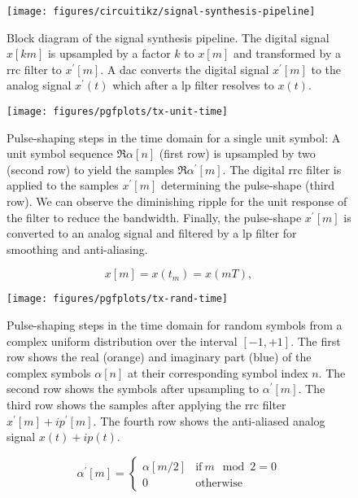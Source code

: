 

\begin{figure}[htb]
	\centering
	\texttt{[image: figures/circuitikz/signal-synthesis-pipeline]}
	\caption{Block diagram of the signal synthesis pipeline. The digital signal $x[km]$ is upsampled by a factor $k$ to $x[m]$ and transformed by a \gls{rrc} filter to $x^\prime[m]$. A \gls{dac} converts the digital signal $x^\prime[m]$ to the analog signal $x^\prime(t)$ which after a \gls{lp} filter resolves to $x(t)$.}
\end{figure}


\begin{figure}[htb]
	\centering
	\texttt{[image: figures/pgfplots/tx-unit-time]}
	\caption{Pulse-shaping steps in the time domain for a single unit symbol: A unit symbol sequence $\Re\alpha[n]$ (first row) is upsampled by two (second row) to yield the samples $\Re\alpha^\prime[m]$. The digital \gls{rrc} filter is applied to the samples $x^\prime[m]$ determining the pulse-shape (third row). We can observe the diminishing ripple for the unit response of the filter to reduce the bandwidth. Finally, the pulse-shape $x^\prime[m]$ is converted to an analog signal and filtered by a \gls{lp} filter for smoothing and anti-aliasing.}\label{fig:pulse_shaping_unit_time}
\end{figure}

\begin{equation}
	x[m]
	=
	x(t_m)
	=
	x(mT)
	,
\end{equation}

\begin{figure}[htb]
	\centering
	\texttt{[image: figures/pgfplots/tx-rand-time]}
	\caption{Pulse-shaping steps in the time domain for random symbols from a complex uniform distribution over the interval $[-1,+1]$. The first row shows the real (orange) and imaginary part (blue) of the complex symbols $\alpha[n]$ at their corresponding symbol index $n$. The second row shows the symbols after upsampling to $\alpha^\prime[m]$. The third row shows the samples after applying the \gls{rrc} filter $x^\prime[m]+ip^\prime[m]$. The fourth row shows the anti-aliased analog signal $x(t)+ip(t)$.}\label{fig:pulse_shaping_rand_time}
\end{figure}

\begin{equation}
	\alpha^\prime[m]
	=
	\begin{cases}
		\alpha[m/2] & \text{if}\ m\mod2=0 \\
		0 & \text{otherwise}
	\end{cases}
\end{equation}


